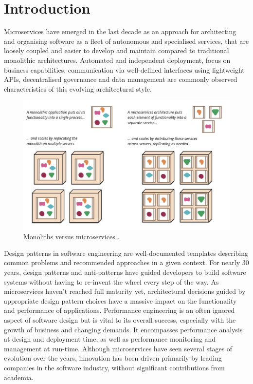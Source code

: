 \chapter{Introduction}

Microservices have emerged in the last decade as an approach for architecting and organising software as a fleet of autonomous and specialised services, that are loosely coupled and easier to develop and maintain compared to traditional monolithic architectures. Automated and independent deployment, focus on business capabilities, communication via well-defined interfaces using lightweight APIs, decentralised governance and data management are commonly observed characteristics of this evolving architectural style.

\begin{figure}[ht]
  \centering
  \includegraphics[width=0.65\linewidth]{./assets/images/mono-micro-lewis.png}
  \caption{Monoliths versus microservices \cite{lewis14}.}
  \label{fig:mono-micro-lewis}
\end{figure}

Design patterns in software engineering are well-documented templates describing common problems and recommended approaches in a given context. For nearly 30 years, design patterns and anti-patterns have guided developers to build software systems without having to re-invent the wheel every step of the way. As microservices haven't reached full maturity yet, architectural decisions guided by appropriate design pattern choices have a massive impact on the functionality and performance of applications. Performance engineering is an often ignored aspect of software design but is vital to its overall success, especially with the growth of business and changing demands. It encompasses performance analysis at design and deployment time, as well as performance monitoring and management at run-time. Although microservices have seen several stages of evolution over the years, innovation has been driven primarily by leading companies in the software industry, without significant contributions from academia. 

